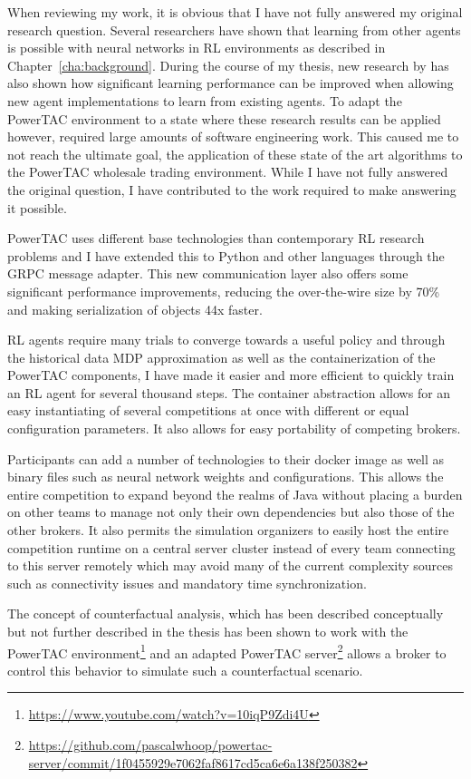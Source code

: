 When reviewing my work, it is obvious that I have not fully answered my original research question. Several researchers
have shown that learning from other agents is possible with neural networks in \ac{RL} environments as described in
Chapter~\ref{cha:background}. During the course of my thesis, new research by \citet{schmitt2018kickstarting}  has also
shown how significant learning performance can be improved when allowing new agent implementations to learn from
existing agents.
To adapt the \ac{PowerTAC} environment to a state where these research results can be applied however, required large
amounts of software engineering work. This caused me to not reach the ultimate goal, the application of these state of
the art algorithms to the \ac{PowerTAC} wholesale trading environment. While I have not fully answered the original
question, I have contributed to the work required to make answering it possible.

\ac{PowerTAC} uses different base technologies than contemporary \ac{RL} research problems and I have extended this to
Python and other languages through the \ac{GRPC} message adapter. This new communication layer also offers some
significant performance improvements, reducing the over-the-wire size by 70\% and making serialization of objects 44x
faster.

\ac{RL} agents require many trials to converge towards a useful policy and through the historical data \ac{MDP}
approximation as well as the containerization of the \ac{PowerTAC} components, I have made it easier and more efficient
to quickly train an \ac{RL} agent for several thousand steps. The container abstraction allows for an easy instantiating
of several competitions at once with different or equal configuration parameters. It also allows for easy portability of
competing brokers.

Participants can add a number of technologies to their docker image as well as binary files such as neural network weights and
configurations. This allows the entire competition to expand beyond the realms of Java without placing a burden on other
teams to manage not only their own dependencies but also those of the other brokers. It also permits the simulation
organizers to easily host the entire competition runtime on a central server cluster instead of every team connecting to
this server remotely which may avoid many of the current complexity sources such as connectivity issues and mandatory
time synchronization.

The concept of counterfactual analysis, which has been described conceptually but not further described in the thesis
has been shown to work with the \ac{PowerTAC} environment\footnote{\url{https://www.youtube.com/watch?v=10iqP9Zdi4U}}
and an adapted \ac{PowerTAC}
server\footnote{\url{https://github.com/pascalwhoop/powertac-server/commit/1f0455929e7062faf8617cd5ca6e6a138f250382}}
allows a broker to control this behavior to simulate such a counterfactual scenario.

